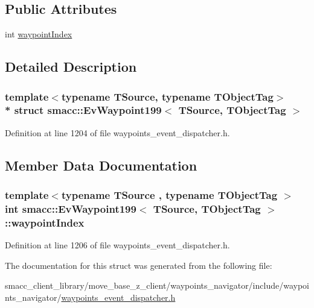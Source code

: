 \subsection*{Public Attributes}
\begin{DoxyCompactItemize}
\item 
int \hyperlink{structsmacc_1_1EvWaypoint199_a636e6d588e0ee968a97d13c9c80c800c}{waypoint\+Index}
\end{DoxyCompactItemize}


\subsection{Detailed Description}
\subsubsection*{template$<$typename T\+Source, typename T\+Object\+Tag$>$\\*
struct smacc\+::\+Ev\+Waypoint199$<$ T\+Source, T\+Object\+Tag $>$}



Definition at line 1204 of file waypoints\+\_\+event\+\_\+dispatcher.\+h.



\subsection{Member Data Documentation}
\subsubsection[{\texorpdfstring{waypoint\+Index}{waypointIndex}}]{\setlength{\rightskip}{0pt plus 5cm}template$<$typename T\+Source , typename T\+Object\+Tag $>$ int {\bf smacc\+::\+Ev\+Waypoint199}$<$ T\+Source, T\+Object\+Tag $>$\+::waypoint\+Index}\hypertarget{structsmacc_1_1EvWaypoint199_a636e6d588e0ee968a97d13c9c80c800c}{}\label{structsmacc_1_1EvWaypoint199_a636e6d588e0ee968a97d13c9c80c800c}


Definition at line 1206 of file waypoints\+\_\+event\+\_\+dispatcher.\+h.



The documentation for this struct was generated from the following file\+:\begin{DoxyCompactItemize}
\item 
smacc\+\_\+client\+\_\+library/move\+\_\+base\+\_\+z\+\_\+client/waypoints\+\_\+navigator/include/waypoints\+\_\+navigator/\hyperlink{waypoints__event__dispatcher_8h}{waypoints\+\_\+event\+\_\+dispatcher.\+h}\end{DoxyCompactItemize}
